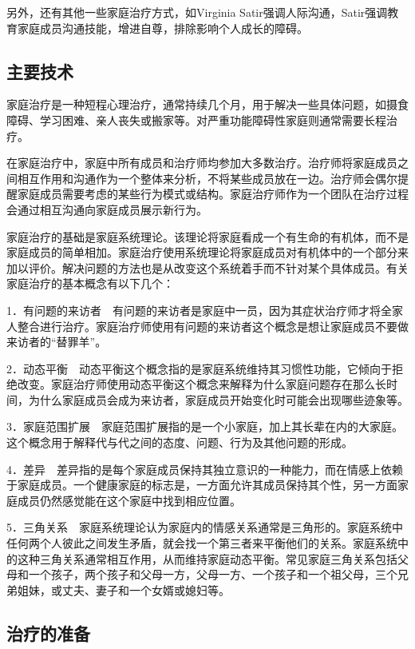另外，还有其他一些家庭治疗方式，如Virginia
Satir强调人际沟通，Satir强调教育家庭成员沟通技能，增进自尊，排除影响个人成长的障碍。

\subsection{主要技术}

家庭治疗是一种短程心理治疗，通常持续几个月，用于解决一些具体问题，如摄食障碍、学习困难、亲人丧失或搬家等。对严重功能障碍性家庭则通常需要长程治疗。

在家庭治疗中，家庭中所有成员和治疗师均参加大多数治疗。治疗师将家庭成员之间相互作用和沟通作为一个整体来分析，不将某些成员放在一边。治疗师会偶尔提醒家庭成员需要考虑的某些行为模式或结构。家庭治疗师作为一个团队在治疗过程会通过相互沟通向家庭成员展示新行为。

家庭治疗的基础是家庭系统理论。该理论将家庭看成一个有生命的有机体，而不是家庭成员的简单相加。家庭治疗使用系统理论将家庭成员对有机体中的一个部分来加以评价。解决问题的方法也是从改变这个系统着手而不针对某个具体成员。有关家庭治疗的基本概念有以下几个：

1．有问题的来访者　有问题的来访者是家庭中一员，因为其症状治疗师才将全家人整合进行治疗。家庭治疗师使用有问题的来访者这个概念是想让家庭成员不要做来访者的“替罪羊”。

2．动态平衡　动态平衡这个概念指的是家庭系统维持其习惯性功能，它倾向于拒绝改变。家庭治疗师使用动态平衡这个概念来解释为什么家庭问题存在那么长时间，为什么家庭成员会成为来访者，家庭成员开始变化时可能会出现哪些迹象等。

3．家庭范围扩展　家庭范围扩展指的是一个小家庭，加上其长辈在内的大家庭。这个概念用于解释代与代之间的态度、问题、行为及其他问题的形成。

4．差异　差异指的是每个家庭成员保持其独立意识的一种能力，而在情感上依赖于家庭成员。一个健康家庭的标志是，一方面允许其成员保持其个性，另一方面家庭成员仍然感觉能在这个家庭中找到相应位置。

5．三角关系　家庭系统理论认为家庭内的情感关系通常是三角形的。家庭系统中任何两个人彼此之间发生矛盾，就会找一个第三者来平衡他们的关系。家庭系统中的这种三角关系通常相互作用，从而维持家庭动态平衡。常见家庭三角关系包括父母和一个孩子，两个孩子和父母一方，父母一方、一个孩子和一个祖父母，三个兄弟姐妹，或丈夫、妻子和一个女婿或媳妇等。

\subsection{治疗的准备}

